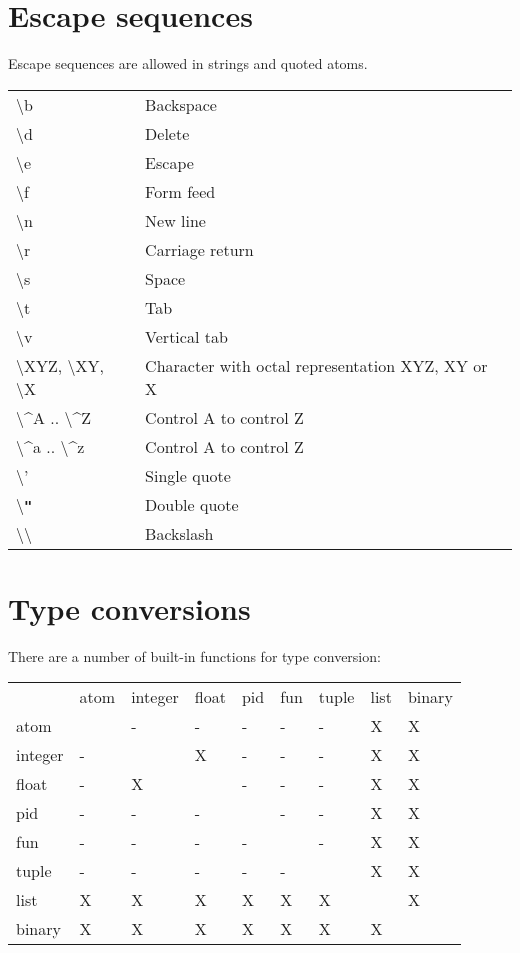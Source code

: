 \section{Escape sequences}
\label{datatypes:escapeseq}
Escape sequences are allowed in strings and quoted atoms.

\begin{center}
\begin{tabular}{|>{\raggedright}p{91pt}|>{\raggedright}p{229pt}|}
\hline
\multicolumn{2}{|p{321pt}|}{Escape sequences}\tabularnewline
\hline
\textbackslash{}b & Backspace\tabularnewline
\hline
\textbackslash{}d & Delete\tabularnewline
\hline
\textbackslash{}e & Escape\tabularnewline
\hline
\textbackslash{}f & Form feed\tabularnewline
\hline
\textbackslash{}n & New line\tabularnewline
\hline
\textbackslash{}r & Carriage return\tabularnewline
\hline
\textbackslash{}s & Space\tabularnewline
\hline
\textbackslash{}t & Tab\tabularnewline
\hline
\textbackslash{}v & Vertical tab\tabularnewline
\hline
\textbackslash{}XYZ, \textbackslash{}XY, \textbackslash{}X & Character with octal
representation XYZ, XY or X\tabularnewline
\hline
\textbackslash{}\textasciicircum{}A .. \textbackslash{}\textasciicircum{}Z & Control
A to control Z\tabularnewline
\hline
\textbackslash{}\textasciicircum{}a .. \textbackslash{}\textasciicircum{}z & Control
A to control Z\tabularnewline
\hline
\textbackslash{}' & Single quote\tabularnewline
\hline
\textbackslash{}\textbf{\texttt{"}} & Double quote\tabularnewline
\hline
\textbackslash{}\textbackslash{} & Backslash\tabularnewline
\hline
\end{tabular}
\end{center}

\section{Type conversions}
There are a number of built-in functions for type conversion:

\begin{center}
\begin{tabular}{|>{\raggedright}p{63pt}|>{\raggedright}p{21pt}|>{\raggedright}p{25pt}|>{\raggedright}p{21pt}|>{\raggedright}p{21pt}|>{\raggedright}p{21pt}|>{\raggedright}p{21pt}|>{\raggedright}p{21pt}|>{\raggedright}p{24pt}|}
\hline
\multicolumn{9}{|p{243pt}|}{Type conversions}\tabularnewline
\hline
 & atom & integer & float & pid & fun & tuple & list & binary\tabularnewline
\hline
atom &  & - & - & - & - & - & X & X\tabularnewline
\hline
integer & - &  & X & - & - & - & X & X\tabularnewline
\hline
float & - & X &  & - & - & - & X & X\tabularnewline
\hline
pid & - & - & - &  & - & - & X & X\tabularnewline
\hline
fun & - & - & - & - &  & - & X & X\tabularnewline
\hline
tuple & - & - & - & - & - &  & X & X\tabularnewline
\hline
list & X & X & X & X & X & X &  & X\tabularnewline
\hline
binary & X & X & X & X & X & X & X & \tabularnewline
\hline
\end{tabular}
\end{center}

